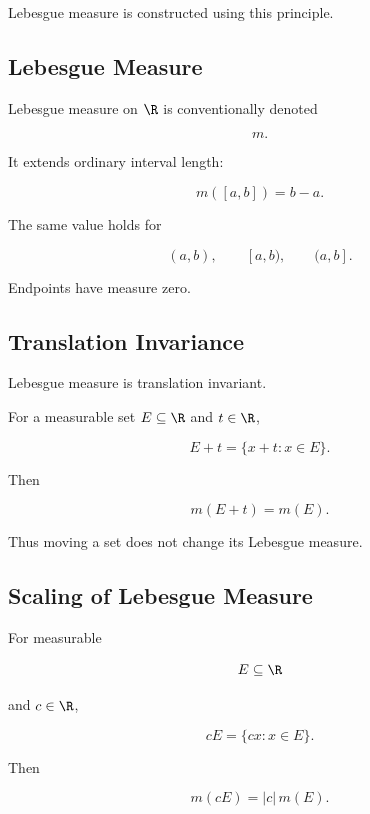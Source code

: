Lebesgue measure is constructed using this principle.

\subsection{Lebesgue Measure}
\label{subsec:lebesgue-measure}

Lebesgue measure on \(\R\) is conventionally denoted

\[
\boxed{
m.
}
\]

It extends ordinary interval length:

\[
\boxed{
m([a,b])=b-a.
}
\]

The same value holds for

\[
(a,b),
\qquad
[a,b),
\qquad
(a,b].
\]

Endpoints have measure zero.

\subsection{Translation Invariance}
\label{subsec:translation-invariance-measure}

Lebesgue measure is translation invariant.

For a measurable set \(E\subseteq\R\) and \(t\in\R\),

\[
E+t
=
\{x+t:x\in E\}.
\]

Then

\[
\boxed{
m(E+t)=m(E).
}
\]

Thus moving a set does not change its Lebesgue measure.

\subsection{Scaling of Lebesgue Measure}
\label{subsec:scaling-lebesgue-measure}

For measurable

\[
E\subseteq\R
\]

and \(c\in\R\),

\[
cE
=
\{cx:x\in E\}.
\]

Then

\[
\boxed{
m(cE)
=
|c|\,m(E).
}
\]

